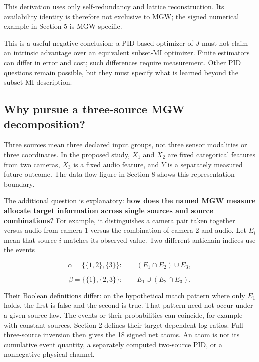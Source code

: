 \documentclass[11pt,a4paper]{article}
\begin{document}
This derivation uses only self-redundancy and lattice reconstruction. Its availability identity is therefore not exclusive to MGW; the signed numerical example in Section 5 is MGW-specific.

This is a useful negative conclusion: a PID-based optimizer of \(J\) must not claim an intrinsic advantage over an equivalent subset-MI optimizer. Finite estimators can differ in error and cost; such differences require measurement. Other PID questions remain possible, but they must specify what is learned beyond the subset-MI description.

\par{}

\subsection{Why pursue a three-source MGW decomposition?}\label{why-pursue-a-three-source-mgw-decomposition}

Three sources mean three declared input groups, not three sensor modalities or three coordinates. In the proposed study, \(X_1\) and \(X_2\) are fixed categorical features from two cameras, \(X_3\) is a fixed audio feature, and \(Y\) is a separately measured future outcome. The data-flow figure in Section 8 shows this representation boundary.

The additional question is explanatory: \textbf{how does the named MGW measure allocate target information across single sources and source combinations?} For example, it distinguishes a camera pair taken together versus audio from camera 1 versus the combination of camera 2 and audio. Let \(E_i\) mean that source \(i\) matches its observed value. Two different antichain indices use the events

\[
\alpha=\{\{1,2\},\{3\}\}:\qquad (E_1\cap E_2)\cup E_3,
\]

\[
\beta=\{\{1\},\{2,3\}\}:\qquad E_1\cup(E_2\cap E_3).
\]

Their Boolean definitions differ: on the hypothetical match pattern where only \(E_1\) holds, the first is false and the second is true. That pattern need not occur under a given source law. The events or their probabilities can coincide, for example with constant sources. Section 2 defines their target-dependent log ratios. Full three-source inversion then gives the 18 signed net atoms. An atom is not its cumulative event quantity, a separately computed two-source PID, or a nonnegative physical channel.
\end{document}

